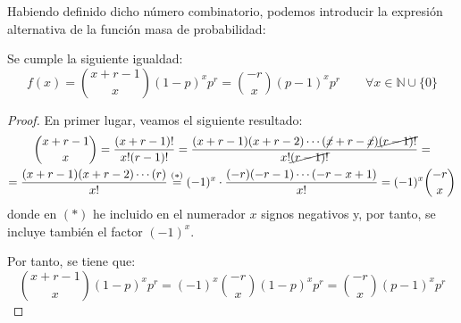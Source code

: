 Habiendo definido dicho número combinatorio, podemos introducir la expresión alternativa de la función masa de probabilidad:
\begin{prop} Se cumple la siguiente igualdad:
    \begin{equation*}
        f(x)=\binom{x+r-1}{x}(1-p)^{x}p^r=\binom{-r}{x}(p-1)^xp^r \qquad \forall x\in \mathbb{N}\cup \{0\}
    \end{equation*}
\end{prop}
\begin{proof}
    En primer lugar, veamos el siguiente resultado:
    \begin{multline*}
        \binom{x+r-1}{x}
        = \frac{(x+r-1)!}{x!(r-1)!}
        = \frac{(x+r-1)(x+r-2)\cdots(\cancel{x}+r-\cancel{x})\cancel{(r-1)!}}{x!\cancel{(r-1)!}}
        =\\= \frac{(x+r-1)(x+r-2)\cdots(r)}{x!}
        \stackrel{(\ast)}{=} (-1)^x\cdot \frac{(-r)(-r-1)\cdots (-r-x+1)}{x!}
        = (-1)^x\binom{-r}{x}
    \end{multline*}
    donde en $(\ast)$ he incluido en el numerador $x$ signos negativos y, por tanto, se incluye también el factor $(-1)^x$.
    
    Por tanto, se tiene que:
    \begin{equation*}
        \binom{x+r-1}{x}(1-p)^{x}p^r
        = (-1)^x\binom{-r}{x}(1-p)^xp^r
        = \binom{-r}{x}(p-1)^xp^r
    \end{equation*}
\end{proof}


